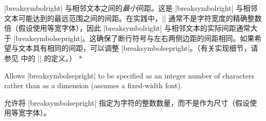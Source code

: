 \begin{optionlist}
\begin{paracol}{2}
\switchcolumn
\item[breaksymbolsepright (尺寸) (\meta{breaksymbolseprightnchars})]
|breaksymbolright| 与相邻文本之间的\emph{最小}间距。这是 |breaksymbolright| 与相邻文本可能达到的最远范围之间的间距。在实践中，|\linewidth| 通常不是字符宽度的精确整数倍（假设使用等宽字体），因此 |breaksymbolright| 与相邻文本的实际间距通常大于 |breaksymbolsepright|。这确保了断行符号与左右两侧边距的间距相同。如果希望与文本具有相同的间距，可以调整 |breaksymbolsepright|。（有关实现细节，请参见  中的 |\FV@makeLineNumber| 的定义。）
\switchcolumn[0]*%
\item[breaksymbolseprightnchars (integer) (2)]
Allows |breaksymbolsepright| to be specified as an integer number of characters rather than as a dimension (assumes a fixed-width font).
\switchcolumn
\item[breaksymbolseprightnchars (整数) (2)]
允许将 |breaksymbolsepright| 指定为字符的整数数量，而不是作为尺寸（假设使用等宽字体）。
\end{paracol}
\end{optionlist}
